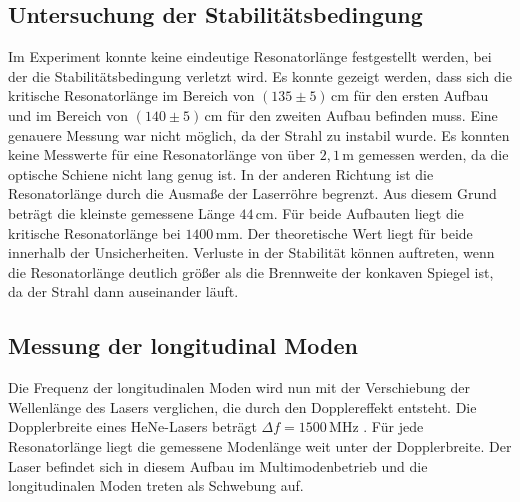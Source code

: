 \subsection{Untersuchung der Stabilitätsbedingung}
\label{sec:Stab_be}
Im Experiment konnte keine eindeutige Resonatorlänge festgestellt werden, bei der die Stabilitätsbedingung verletzt wird.
Es konnte gezeigt werden, dass sich die kritische Resonatorlänge im Bereich von $ \left( 135 \pm 5 \right) \, \unit{\centi\meter}$ für den ersten Aufbau und im Bereich von
$ \left( 140 \pm 5 \right) \, \unit{\centi\meter}$ für den zweiten Aufbau befinden muss. Eine genauere Messung war nicht möglich, da der Strahl zu instabil wurde.
Es konnten keine Messwerte für eine Resonatorlänge von über $2,1 \, \unit{\meter}$ gemessen werden, da die optische Schiene nicht lang genug ist.
In der anderen Richtung ist die Resonatorlänge durch die Ausmaße der Laserröhre begrenzt. Aus diesem Grund beträgt die kleinste gemessene Länge $ 44 \, \unit{\centi\meter}$.
Für beide Aufbauten liegt die kritische Resonatorlänge bei $1400 \, \unit{\milli\meter}$. Der theoretische Wert liegt für beide innerhalb der Unsicherheiten. 
Verluste in der Stabilität können auftreten, wenn die Resonatorlänge deutlich größer als die Brennweite der konkaven Spiegel ist, da der Strahl dann auseinander läuft.



\subsection{Messung der longitudinal Moden}
\label{sec:Stab_be}

Die Frequenz der longitudinalen Moden wird nun mit der Verschiebung der Wellenlänge des Lasers verglichen, die durch den Dopplereffekt entsteht.
Die Dopplerbreite eines HeNe-Lasers beträgt $ \Delta f = 1500 \, \unit{\mega\hertz}$ \cite{eicheich}. Für jede Resonatorlänge liegt die gemessene Modenlänge weit unter der Dopplerbreite.
Der Laser befindet sich in diesem Aufbau im Multimodenbetrieb und die longitudinalen Moden treten als Schwebung auf.
